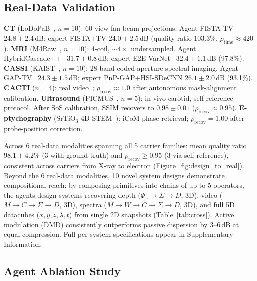 \documentclass[11pt,a4paper]{article}
\begin{document}
\subsection{Real-Data Validation}
\label{sec:real}

\textbf{CT} (LoDoPaB~\cite{leuschner2021}, $n{=}10$): 60-view fan-beam projections.  Agent FISTA-TV~\cite{beck2009fista} $24.8 \pm 2.4$\,dB; expert FISTA+TV $24.0 \pm 2.5$\,dB (quality ratio 103.3\%, $\rho_{\text{time}} \approx 420$).
\textbf{MRI} (M4Raw~\cite{lyu2023m4raw}, $n{=}10$): 4-coil, ${\sim}4\times$ undersampled.  Agent HybridCascade++~\cite{aggarwal2019modl} $31.7 \pm 0.8$\,dB; expert E2E-VarNet~\cite{sriram2020endtoend} $32.4 \pm 1.1$\,dB (97.8\%).
\textbf{CASSI} (KAIST~\cite{meng2020gap}, $n{=}10$): 28-band coded aperture spectral imaging.  Agent GAP-TV~\cite{meng2020gap} $24.3 \pm 1.5$\,dB; expert PnP-GAP+HSI-SDeCNN $26.1 \pm 2.0$\,dB (93.1\%).
\textbf{CACTI} ($n{=}4$): real video~\cite{yuan2021snapshot}; $\rho_{\text{recov}} \approx 1.0$ after autonomous mask-alignment calibration.
\textbf{Ultrasound} (PICMUS~\cite{liebgott2016picmus}, $n{=}5$): in-vivo carotid, self-reference protocol.  After SoS calibration, SSIM recovers to $0.98 \pm 0.01$ ($\rho_{\text{recov}} \approx 0.95$).
\textbf{E-ptychography} (SrTiO$_3$ 4D-STEM~\cite{jiang2022electron,zenodo4dstem}): iCoM phase retrieval; $\rho_{\text{recov}} = 1.00$ after probe-position correction.

Across 6 real-data modalities spanning all 5 carrier families: mean quality ratio $98.1 \pm 4.2$\% (3 with ground truth) and $\rho_{\text{recov}} \geq 0.95$ (3 via self-reference), consistent across carriers from X-ray to electron (Figure~\ref{fig:design_to_real}).  Beyond the 6 real-data modalities, 10 novel system designs demonstrate compositional reach: by composing primitives into chains of up to 5 operators, the agents design systems recovering depth ($\Phi_z{\to}\Sigma{\to}D$, 3D), video ($M{\to}C{\to}\Sigma{\to}D$, 3D), spectra ($M{\to}W{\to}C{\to}\Sigma{\to}D$, 3D), and full 5D datacubes ($x,y,z,\lambda,t$) from single 2D snapshots (Table~\ref{tab:cross}).  Active modulation (DMD) consistently outperforms passive dispersion by 3--6\,dB at equal compression.  Full per-system specifications appear in Supplementary Information.


\subsection{Agent Ablation Study}
\label{sec:ablation}
\end{document}
